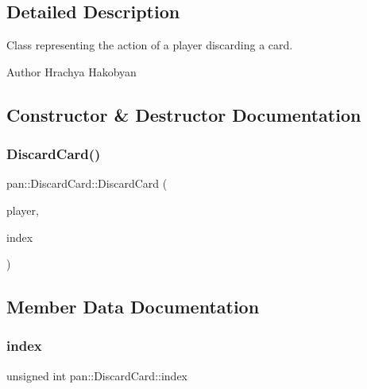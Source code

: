 \subsection{Detailed Description}
Class representing the action of a player discarding a card. 

\begin{DoxyAuthor}{Author}
Hrachya Hakobyan 
\end{DoxyAuthor}


\subsection{Constructor \& Destructor Documentation}
\mbox{\label{classpan_1_1_discard_card_a5a4f4d975057d33f91e857a1b36b275b}} 
\subsubsection{\texorpdfstring{Discard\+Card()}{DiscardCard()}}
{\footnotesize\ttfamily pan\+::\+Discard\+Card\+::\+Discard\+Card (\begin{DoxyParamCaption}\item[{\hyperlink{namespacepan_a0cdabf874fbf1bb3a1f0152d108c2909}{Player\+Index}}]{player,  }\item[{unsigned int}]{index }\end{DoxyParamCaption})}



\subsection{Member Data Documentation}
\mbox{\label{classpan_1_1_discard_card_a62efd70c54ac4e21ec4d5c719bd8ef23}} 
\subsubsection{\texorpdfstring{index}{index}}
{\footnotesize\ttfamily unsigned int pan\+::\+Discard\+Card\+::index}

\mbox{\label{classpan_1_1_discard_card_a92d202c3983f09cac6ad0350b10359a9}} 
